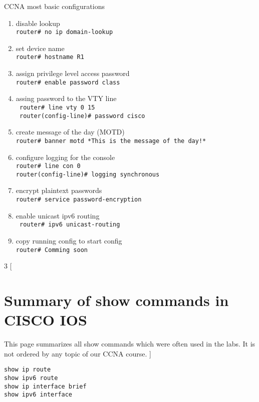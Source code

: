 \documentclass[10pt, a4paper]{article}
\begin{document}
\begin{center}
\huge CCNA most basic configurations
\end{center}
\vspace{1cm}

\begin{enumerate}

\item disable lookup \\ 
\lstinline|router# no ip domain-lookup|

\item set device name  \\ 
\lstinline|router# hostname R1|


\item assign privilege level access password \\ 
\lstinline|router# enable password class|

\item assing password to the VTY line \\ 
\lstinline| router# line vty 0 15| \\
\lstinline| router(config-line)# password cisco|


\item create message of the day (MOTD) \\ 
\lstinline|router# banner motd *This is the message of the day!*|


\item configure logging for the console \\
\lstinline|router# line con 0| \\
\lstinline|router(config-line)# logging synchronous|

\item encrypt plaintext passwords \\ 
\lstinline|router# service password-encryption|

\item enable unicast ipv6 routing \\ 
\lstinline| router# ipv6 unicast-routing|

\item copy running config to start config \\ 
\lstinline|router# Comming soon|
\end{enumerate}

\begin{landscape}
\begin{multicols*}{3}
	[
	\section{Summary of show commands in CISCO IOS}	
	This page summarizes all show commands which were often used in the labs. 
	It is not ordered by any topic of our CCNA course.
	]
\noindent
\begin{lstlisting}
show ip route
show ipv6 route
show ip interface brief
show ipv6 interface
\end{lstlisting}
	
\end{multicols*}
\end{landscape}
\end{document}
